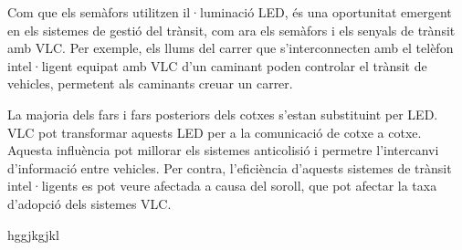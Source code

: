 Com que els semàfors utilitzen il·luminació LED, és una oportunitat emergent en els sistemes de gestió del trànsit, com ara els semàfors i els senyals de trànsit amb VLC. Per exemple, els llums del carrer que s'interconnecten amb el telèfon intel·ligent equipat amb VLC d'un caminant poden controlar el trànsit de vehicles, permetent als caminants creuar un carrer.

La majoria dels fars i fars posteriors dels cotxes s'estan substituint per LED. VLC pot transformar aquests LED per a la comunicació de cotxe a cotxe. Aquesta influència pot millorar els sistemes anticolisió i permetre l'intercanvi d'informació entre vehicles. Per contra, l'eficiència d'aquests sistemes de trànsit intel·ligents es pot veure afectada a causa del soroll, que pot afectar la taxa d'adopció dels sistemes VLC.


hggjkgjkl